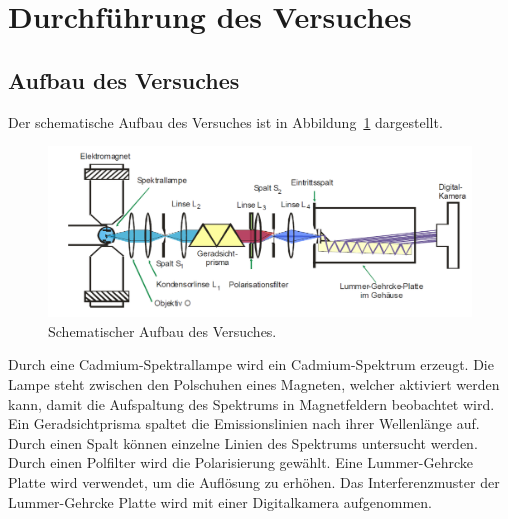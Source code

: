\section{Durchführung des Versuches}
\label{sec:Durchführung}

\subsection{Aufbau des Versuches}
\label{subsec:aufbau}
Der schematische Aufbau des Versuches ist in Abbildung~\ref{fig:aufbau}
dargestellt.
\begin{figure}[H]
  \centering
  \includegraphics[scale=0.4]{pictures/aufbau.png}
  \caption{Schematischer Aufbau des Versuches. \cite{Versuchsbeschreibung}}
  \label{fig:aufbau}
\end{figure}
\noindent
Durch eine Cadmium-Spektrallampe wird ein Cadmium-Spektrum erzeugt. Die
Lampe steht zwischen den Polschuhen eines Magneten, welcher aktiviert
werden kann, damit die Aufspaltung des Spektrums in Magnetfeldern beobachtet
wird. Ein Geradsichtprisma spaltet die Emissionslinien nach ihrer
Wellenlänge auf. Durch einen Spalt können einzelne Linien des Spektrums
untersucht werden. Durch einen Polfilter wird die Polarisierung gewählt.
Eine Lummer-Gehrcke Platte wird verwendet, um die Auflösung zu
erhöhen. Das Interferenzmuster der Lummer-Gehrcke Platte wird mit einer
Digitalkamera aufgenommen.

